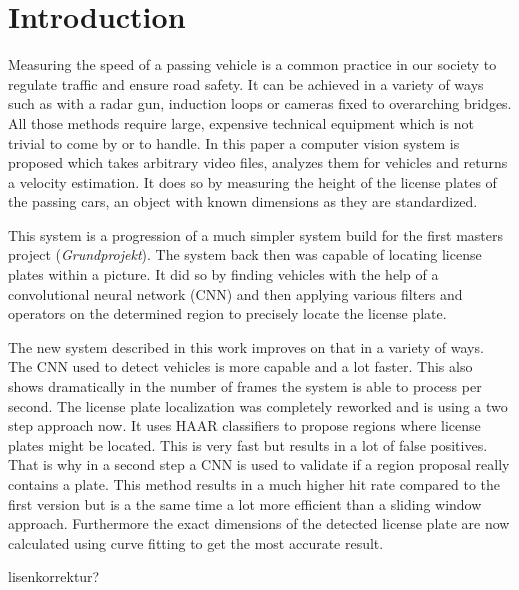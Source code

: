 \chapter{Introduction}\label{ch:introduction}

Measuring the speed of a passing vehicle is a common practice in our society to regulate traffic and ensure road safety.
It can be achieved in a variety of ways such as with a radar gun, induction loops or cameras fixed to overarching bridges.
All those methods require large, expensive technical equipment which is not trivial to come by or to handle.
In this paper a computer vision system is proposed which takes arbitrary video files, analyzes them for vehicles and returns a velocity estimation.
It does so by measuring the height of the license plates of the passing cars, an object with known dimensions as they are standardized.

This system is a progression of a much simpler system build for the first masters project (\textit{Grundprojekt}).
The system back then was capable of locating license plates within a picture.
It did so by finding vehicles with the help of a convolutional neural network (CNN) and then applying various filters and operators on the determined region to precisely locate the license plate.

The new system described in this work improves on that in a variety of ways.
The CNN used to detect vehicles is more capable and a lot faster.
This also shows dramatically in the number of frames the system is able to process per second.
The license plate localization was completely reworked and is using a two step approach now.
It uses HAAR classifiers to propose regions where license plates might be located.
This is very fast but results in a lot of false positives.
That is why in a second step a CNN is used to validate if a region proposal really contains a plate.
This method results in a much higher hit rate compared to the first version but is a the same time a lot more efficient than a sliding window approach.
Furthermore the exact dimensions of the detected license plate are now calculated using curve fitting to get the most accurate result.


lisenkorrektur?

